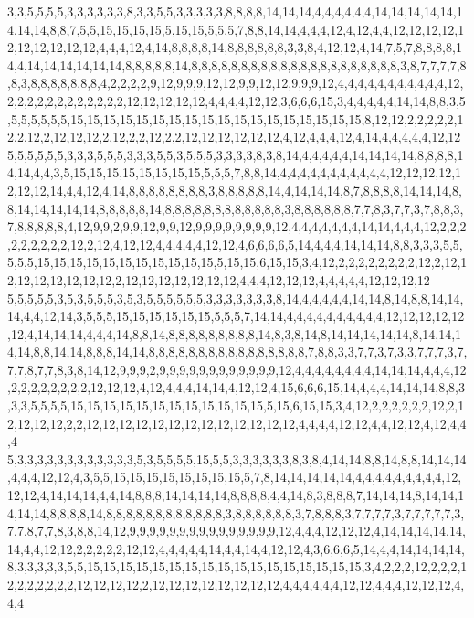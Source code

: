 3,3,5,5,5,5,3,3,3,3,3,3,8,3,3,5,5,3,3,3,3,3,8,8,8,8,14,14,14,4,4,4,4,4,4,14,14,14,14,14,14,14,14,8,8,7,5,5,15,15,15,15,5,15,15,5,5,5,7,8,8,14,14,4,4,4,12,4,12,4,4,12,12,12,12,12,12,12,12,12,12,4,4,4,12,4,14,8,8,8,8,14,8,8,8,8,8,8,3,3,8,4,12,12,4,14,7,5,7,8,8,8,8,14,4,14,14,14,14,14,14,8,8,8,8,8,14,8,8,8,8,8,8,8,8,8,8,8,8,8,8,8,8,8,8,8,8,8,3,8,7,7,7,7,8,8,3,8,8,8,8,8,8,8,4,2,2,2,2,9,12,9,9,9,12,12,9,9,12,12,9,9,9,12,4,4,4,4,4,4,4,4,4,4,4,12,2,2,2,2,2,2,2,2,2,2,2,2,12,12,12,12,12,4,4,4,4,12,12,3,6,6,6,15,3,4,4,4,4,4,14,14,8,8,3,5,5,5,5,5,5,5,15,15,15,15,15,15,15,15,15,15,15,15,15,15,15,15,15,15,8,12,12,2,2,2,2,2,12,2,12,2,12,12,12,2,12,2,2,12,2,2,12,12,12,12,12,12,4,12,4,4,4,12,4,14,4,4,4,4,4,12,12
5,5,5,5,5,5,3,3,3,5,5,5,3,3,3,5,5,3,5,5,5,3,3,3,3,8,3,8,14,4,4,4,4,4,14,14,14,14,8,8,8,8,14,14,4,4,3,5,15,15,15,15,15,15,15,15,5,5,5,7,8,8,14,4,4,4,4,4,4,4,4,4,4,4,12,12,12,12,12,12,12,14,4,4,12,4,14,8,8,8,8,8,8,8,8,3,8,8,8,8,8,14,4,14,14,14,8,7,8,8,8,8,14,14,14,8,8,14,14,14,14,14,8,8,8,8,8,14,8,8,8,8,8,8,8,8,8,8,8,8,3,8,8,8,8,8,8,7,7,8,3,7,7,3,7,8,8,3,7,8,8,8,8,8,4,12,9,9,2,9,9,12,9,9,12,9,9,9,9,9,9,9,9,12,4,4,4,4,4,4,4,14,14,4,4,4,12,2,2,2,2,2,2,2,2,2,12,2,12,4,12,12,4,4,4,4,4,12,12,4,6,6,6,6,5,14,4,4,4,14,14,14,8,8,3,3,3,5,5,5,5,5,15,15,15,15,15,15,15,15,15,15,15,5,15,15,6,15,15,3,4,12,2,2,2,2,2,2,2,2,12,2,12,12,12,12,12,12,12,12,2,12,12,12,12,12,12,12,4,4,4,12,12,12,4,4,4,4,4,12,12,12,12
5,5,5,5,5,3,5,3,5,5,5,3,5,3,5,5,5,5,5,5,3,3,3,3,3,3,3,8,14,4,4,4,4,4,14,14,8,14,8,8,14,14,14,4,4,12,14,3,5,5,5,15,15,15,15,15,15,5,5,5,7,14,14,4,4,4,4,4,4,4,4,4,4,12,12,12,12,12,12,4,14,14,14,4,4,4,14,8,8,14,8,8,8,8,8,8,8,8,8,14,8,3,8,14,8,14,14,14,14,14,8,14,14,14,14,8,8,14,14,8,8,8,14,14,8,8,8,8,8,8,8,8,8,8,8,8,8,8,8,8,7,8,8,3,3,7,7,3,7,3,3,7,7,7,3,7,7,7,8,7,7,8,3,8,14,12,9,9,9,2,9,9,9,9,9,9,9,9,9,9,9,9,12,4,4,4,4,4,4,4,4,14,14,14,4,4,4,12,2,2,2,2,2,2,2,2,12,12,12,4,12,4,4,4,14,14,4,12,12,4,15,6,6,6,15,14,4,4,4,14,14,14,8,8,3,3,3,5,5,5,5,15,15,15,15,15,15,15,15,15,15,15,15,5,15,6,15,15,3,4,12,2,2,2,2,2,2,12,2,12,12,12,12,2,2,12,12,12,12,12,12,12,12,12,12,12,12,12,4,4,4,4,12,12,4,4,12,12,4,12,4,4,4
5,3,3,3,3,3,3,3,3,3,3,3,3,5,3,5,5,5,5,15,5,5,3,3,3,3,3,3,8,3,8,4,14,14,8,8,14,8,8,14,14,14,4,4,4,12,12,4,3,5,5,15,15,15,15,15,15,15,15,5,7,8,14,14,14,14,14,4,4,4,4,4,4,4,4,4,12,12,12,4,14,14,14,4,4,14,8,8,8,14,14,14,14,8,8,8,8,4,4,14,8,3,8,8,8,7,14,14,14,8,14,14,14,14,14,8,8,8,8,14,8,8,8,8,8,8,8,8,8,8,8,8,3,8,8,8,8,8,8,3,7,8,8,8,3,7,7,7,7,3,7,7,7,7,7,3,7,7,8,7,7,8,3,8,8,14,12,9,9,9,9,9,9,9,9,9,9,9,9,9,9,9,12,4,4,4,12,12,12,4,14,14,14,14,14,14,4,4,12,12,2,2,2,2,2,12,12,4,4,4,4,4,14,4,4,14,4,12,12,4,3,6,6,6,5,14,4,4,14,14,14,14,8,3,3,3,3,3,5,5,15,15,15,15,15,15,15,15,15,15,15,15,15,15,15,15,15,3,4,2,2,2,12,2,2,2,12,2,2,2,2,2,2,12,12,12,12,2,12,12,12,12,12,12,12,12,4,4,4,4,4,4,12,12,4,4,4,12,12,12,4,4,4
